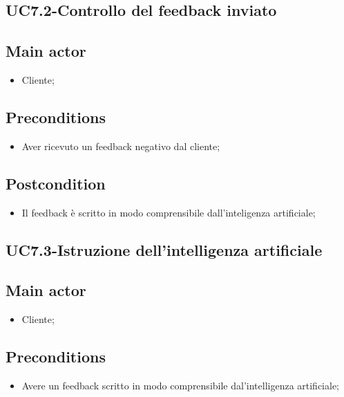 \documentclass{article}
\begin{document}
\subsection{UC7.2-Controllo del feedback inviato}
    
     \subsection*{Main actor}
         \begin{itemize}
             \item Cliente;
         \end{itemize}
     \subsection*{Preconditions} 
        \begin{itemize}
            \item Aver ricevuto un feedback negativo dal cliente;
        \end{itemize}
        \subsection*{Postcondition} 
        \begin{itemize}
            \item Il feedback è scritto in modo comprensibile dall'inteligenza artificiale;
        \end{itemize}
\subsection{UC7.3-Istruzione dell'intelligenza artificiale}
    
     \subsection*{Main actor}
         \begin{itemize}
             \item Cliente;
         \end{itemize}
     \subsection*{Preconditions} 
        \begin{itemize}
            \item Avere un feedback scritto in modo comprensibile dal'intelligenza artificiale;
        \end{itemize}
\end{document}
